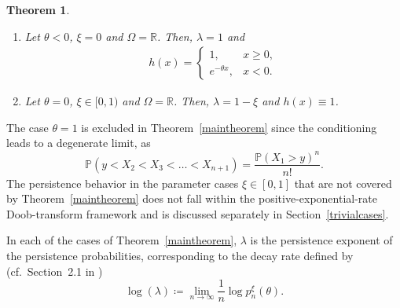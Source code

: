 \documentclass[12pt]{article}
\newcommand{\R}{\mathbb{R}} %
\renewcommand{\P}{\mathbb{P}} %
\newcommand{\1}{\mathds{1}}
\theoremstyle{definition}
\theoremstyle{plain}
\newtheorem{Theorem}[definition]{Theorem}
\theoremstyle{remark}
\begin{document}
\begin{Theorem}
\begin{enumerate}[label=(\roman*)]
\begin{align*}
\begin{cases}
        \end{cases}
 \end{align*}
 \item Let $\theta <0$, $\xi=0$ and $\Omega=\R$. Then, $\lambda=1$ and \begin{align} \label{eqn:lasth}
    h(x)=\begin{cases}
        1,~~&x\ge 0,
        \\ e^{-\theta x},&x<0.
    \end{cases}
\end{align}
 \item Let $\theta=0$, $\xi\in[0,1)$ and $\Omega=\R$. Then, $\lambda=1-\xi$ and $h(x)\equiv 1$.
\end{enumerate}
\end{Theorem}
    The case $\theta=1$ is excluded in Theorem~\ref{maintheorem} since the conditioning leads to a degenerate limit, as $$\P(y<X_2<X_3<\dots<X_{n+1})=\frac{\P(X_1>y)^n}{n!}.$$  
    The persistence behavior in the parameter cases $\xi\in[0,1]$
    that are not covered by Theorem~\ref{maintheorem} does not fall within the positive-exponential-rate Doob-transform framework and is discussed separately in Section~\ref{trivialcases}.

    In each of the cases of Theorem~\ref{maintheorem}, $\lambda$ is  
    the persistence exponent of the persistence probabilities, corresponding to the decay rate defined by (cf.\ Section~2.1 in \cite{AMZ})
    $$
    \log(\lambda)\coloneqq\lim_{n\to\infty}\frac{1}{n}\log p_n^\xi(\theta).
    $$
\end{document}

